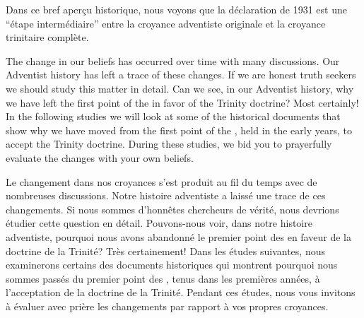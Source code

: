 Dans ce bref aperçu historique, nous voyons que la déclaration de 1931 est une “étape intermédiaire” entre la croyance adventiste originale et la croyance trinitaire complète.


The change in our beliefs has occurred over time with many discussions. Our Adventist history has left a trace of these changes. If we are honest truth seekers we should study this matter in detail. Can we see, in our Adventist history, why we have left the first point of the  in favor of the Trinity doctrine? Most certainly! In the following studies we will look at some of the historical documents that show why we have moved from the first point of the , held in the early years, to accept the Trinity doctrine. During these studies, we bid you to prayerfully evaluate the changes with your own beliefs.


Le changement dans nos croyances s'est produit au fil du temps avec de nombreuses discussions. Notre histoire adventiste a laissé une trace de ces changements. Si nous sommes d'honnêtes chercheurs de vérité, nous devrions étudier cette question en détail. Pouvons-nous voir, dans notre histoire adventiste, pourquoi nous avons abandonné le premier point des  en faveur de la doctrine de la Trinité? Très certainement! Dans les études suivantes, nous examinerons certains des documents historiques qui montrent pourquoi nous sommes passés du premier point des , tenus dans les premières années, à l'acceptation de la doctrine de la Trinité. Pendant ces études, nous vous invitons à évaluer avec prière les changements par rapport à vos propres croyances.


